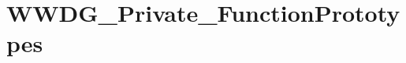 \hypertarget{group___w_w_d_g___private___function_prototypes}{}\section{W\+W\+D\+G\+\_\+\+Private\+\_\+\+Function\+Prototypes}
\label{group___w_w_d_g___private___function_prototypes}
